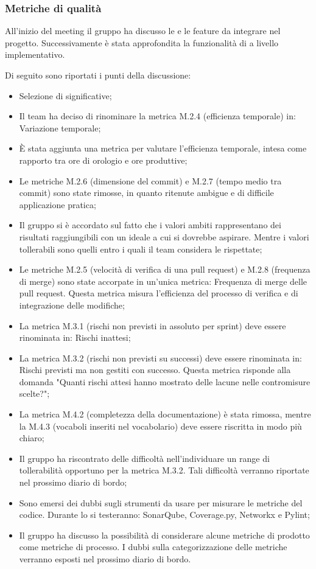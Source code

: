 \subsubsection{Metriche di qualità}
\par All'inizio del meeting il gruppo ha discusso le  e le feature da integrare nel progetto. Successivamente è stata approfondita la funzionalità di  a livello implementativo.
\par Di seguito sono riportati i punti della discussione:
\begin{itemize}
	\item Selezione di  significative;
	\item Il team ha deciso di rinominare la metrica M.2.4 (efficienza temporale) in: Variazione temporale;
	\item È stata aggiunta una metrica per valutare l'efficienza temporale, intesa come rapporto tra ore di orologio e ore produttive;
	\item Le metriche M.2.6 (dimensione del commit) e M.2.7 (tempo medio tra commit) sono state rimosse, in quanto ritenute ambigue e di difficile applicazione pratica;
	\item Il gruppo si è accordato sul fatto che i valori ambiti rappresentano dei risultati raggiungibili con un \glossario{\WoW} ideale a cui si dovrebbe aspirare. Mentre i valori tollerabili sono quelli entro i quali il team considera le  rispettate;
	\item Le metriche M.2.5 (velocità di verifica di una pull request) e M.2.8 (frequenza di merge) sono state accorpate in un'unica metrica: Frequenza di merge delle pull request. Questa metrica misura l'efficienza del processo di verifica e di integrazione delle modifiche;
	\item La metrica M.3.1 (rischi non previsti in assoluto per sprint) deve essere rinominata in: Rischi inattesi;
	\item La metrica M.3.2 (rischi non previsti su successi) deve essere rinominata in: Rischi previsti ma non gestiti con successo. Questa metrica risponde alla domanda "Quanti rischi attesi hanno mostrato delle lacune nelle contromisure scelte?";
	\item La metrica M.4.2 (completezza della documentazione) è stata rimossa, mentre la M.4.3 (vocaboli inseriti nel vocabolario) deve essere riscritta in modo più chiaro;
	\item Il gruppo ha riscontrato delle difficoltà nell'individuare un range di tollerabilità opportuno per la metrica M.3.2. Tali difficoltà verranno riportate nel prossimo diario di bordo;
	\item Sono emersi dei dubbi sugli strumenti da usare per misurare le metriche del codice. Durante lo  si testeranno: SonarQube, Coverage.py, Networkx e Pylint;
	\item Il gruppo ha discusso la possibilità di considerare alcune metriche di prodotto come metriche di processo. I dubbi sulla categorizzazione delle metriche verranno esposti nel prossimo diario di bordo.
\end{itemize}

